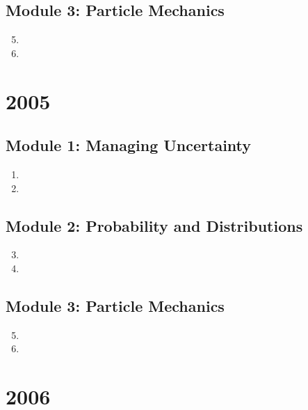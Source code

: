 \documentclass[fleqn,titlepage]{book}
\numberwithin{equation}{section}
\theoremstyle{plain}
\theoremstyle{definition}
\theoremstyle{remark}
\begin{document}
\section{Module 3: Particle Mechanics}
\begin{enumerate}[label=\bfseries  \arabic*.]\setcounter{enumi}{4}
\item %
\item %
\end{enumerate}

\chapter{2005}
\section{Module 1: Managing Uncertainty}
\begin{enumerate}[label=\bfseries  \arabic*.]\setcounter{enumi}{0}
\item 
\item 
\end{enumerate}
\section{Module 2: Probability and Distributions}
\begin{enumerate}[label=\bfseries  \arabic*.]\setcounter{enumi}{2}
\item 
\item 
\end{enumerate}
\section{Module 3: Particle Mechanics}
\begin{enumerate}[label=\bfseries  \arabic*.]\setcounter{enumi}{4}
\item 
\item 
\end{enumerate}

\chapter{2006}
\end{document}
